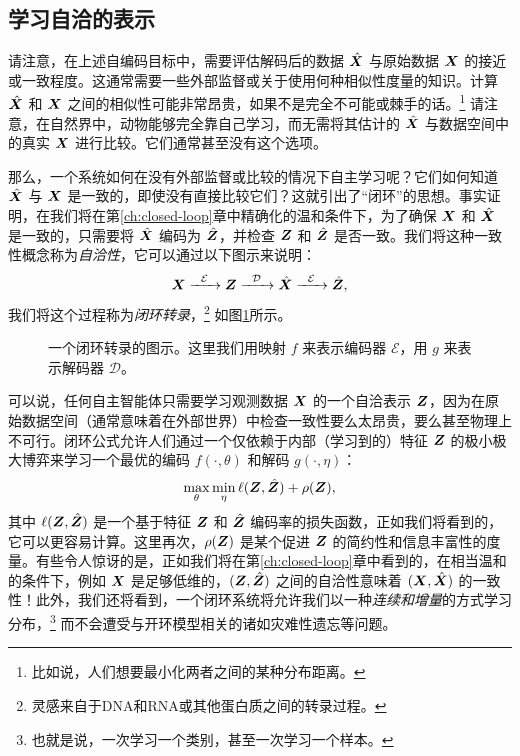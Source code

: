\documentclass[../../book-main.tex]{subfiles}
\begin{document}
\subsection{学习自洽的表示}
请注意，在上述自编码目标中，需要评估解码后的数据 $\hat {\bm{X}}$ 与原始数据 $\bm{X}$ 的接近或一致程度。这通常需要一些外部监督或关于使用何种相似性度量的知识。计算 $\hat {\bm{X}}$ 和 $\bm{X}$ 之间的相似性可能非常昂贵，如果不是完全不可能或棘手的话。\footnote{比如说，人们想要最小化两者之间的某种分布距离。} 请注意，在自然界中，动物能够完全靠自己学习，而无需将其估计的 $\hat {\bm{X}}$ 与数据空间中的真实 $\bm{X}$ 进行比较。它们通常甚至没有这个选项。

那么，一个系统如何在没有外部监督或比较的情况下自主学习呢？它们如何知道 $\hat {\bm{X}}$ 与 $\bm{X}$ 是一致的，即使没有直接比较它们？这就引出了“闭环”的思想。事实证明，在我们将在第\ref{ch:closed-loop}章中精确化的温和条件下，为了确保 $\bm{X}$ 和 $\hat {\bm{X}}$ 是一致的，只需要将 $\hat {\bm{X}}$ 编码为 $\hat {\bm{Z}}$，并检查 $\bm{Z}$ 和 $\hat {\bm{Z}}$ 是否一致。我们将这种一致性概念称为{\em 自洽性}，它可以通过以下图示来说明：
\begin{equation}
    \bm{X}   \xrightarrow{\hspace{2mm} \mathcal{E}\hspace{2mm}} \bm{Z}  \xrightarrow{\hspace{2mm} \mathcal{D} \hspace{2mm}} \hat {\bm{X}} \xrightarrow{\hspace{2mm} \mathcal{E}\hspace{2mm}} \hat {\bm{Z}},
    \label{eqn:closed-loop}
\end{equation}
我们将这个过程称为{\em 闭环转录}，\footnote{灵感来自于DNA和RNA或其他蛋白质之间的转录过程。} 如图\ref{fig:closed-loop}所示。

\begin{figure}[t]
\caption{一个闭环转录的图示。这里我们用映射 $f$ 来表示编码器 $\mathcal{E}$，用 $g$ 来表示解码器 $\mathcal{D}$。}  \label{fig:closed-loop}
\end{figure}

可以说，任何自主智能体只需要学习观测数据 $\bm{X}$ 的一个自洽表示 $\bm{Z}$，因为在原始数据空间（通常意味着在外部世界）中检查一致性要么太昂贵，要么甚至物理上不可行。闭环公式允许人们通过一个仅依赖于内部（学习到的）特征 $\bm{Z}$ 的极小极大博弈来学习一个最优的编码 $f(\cdot, \theta)$ 和解码 $g(\cdot, \eta)$：
\begin{equation}
\max_{\theta}\min_{\eta} \ell( \bm{Z}, \hat {\bm{Z}}) + \rho(\bm{Z}), 
   \label{eqn:closed-loop-objective}
\end{equation}
其中 $\ell( \bm{Z}, \hat {\bm{Z}})$ 是一个基于特征 $\bm{Z}$ 和 $\hat {\bm{Z}}$ 编码率的损失函数，正如我们将看到的，它可以更容易计算。这里再次，$\rho(\bm{Z})$ 是某个促进 $\bm{Z}$ 的简约性和信息丰富性的度量。有些令人惊讶的是，正如我们将在第\ref{ch:closed-loop}章中看到的，在相当温和的条件下，例如 $\bm{X}$ 是足够低维的，$(\bm{Z}, \hat {\bm{Z}})$ 之间的自洽性意味着 $(\bm{X}, \hat {\bm{X}})$ 的一致性！此外，我们还将看到，一个闭环系统将允许我们以一种{\em 连续和增量}的方式学习分布，\footnote{也就是说，一次学习一个类别，甚至一次学习一个样本。} 而不会遭受与开环模型相关的诸如灾难性遗忘等问题。
\end{document}
